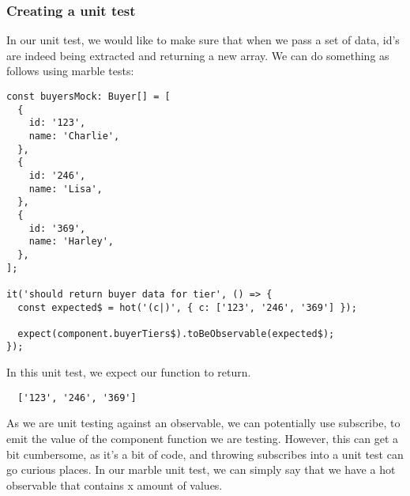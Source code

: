 \subsubsection{Creating a unit test}
In our unit test, we would like to make sure that when we pass a set of data,
id's are indeed being extracted and returning a new array. We can do something
as follows using marble tests:

\begin{lstlisting}
const buyersMock: Buyer[] = [
  {
    id: '123',
    name: 'Charlie',
  },
  {
    id: '246',
    name: 'Lisa',
  },
  {
    id: '369',
    name: 'Harley',
  },
];

it('should return buyer data for tier', () => {
  const expected$ = hot('(c|)', { c: ['123', '246', '369'] });

  expect(component.buyerTiers$).toBeObservable(expected$);
});
\end{lstlisting}

In this unit test, we expect our function to return.
\begin{verbatim}
  ['123', '246', '369']
\end{verbatim}

As we are unit testing against an observable, we can potentially use subscribe,
to emit the value of the component function we are testing. However, this can
get a bit cumbersome, as it's a bit of code, and throwing subscribes into a unit
test can go curious places. In our marble unit test, we can simply say that we
have a hot observable that contains x amount of values.
